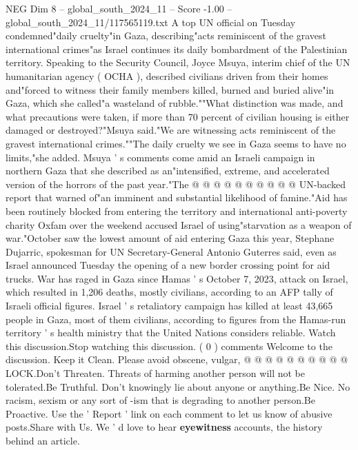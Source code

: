 \begin{textsample}{NEG Dim 8 – global\_south\_2024\_11 – Score -1.00 – global\_south\_2024\_11/117565119.txt}  \label{ex:f8_neg_311}
A top UN official on Tuesday condemned"daily cruelty"in Gaza, describing"acts reminiscent of the gravest international crimes"as Israel continues its daily bombardment of the Palestinian territory.
Speaking to the Security Council, Joyce Msuya, interim chief of the UN humanitarian agency ( OCHA ), described civilians driven from their homes and"forced to witness their family members killed, burned and buried alive"in Gaza, which she called"a wasteland of rubble.""What distinction was made, and what precautions were taken, if more than 70 percent of civilian housing is either damaged or destroyed?"Msuya said."We are witnessing acts reminiscent of the gravest international crimes.""The daily cruelty we see in Gaza seems to have no limits,"she added.
Msuya ' s comments come amid an Israeli campaign in northern Gaza that she described as an"intensified, extreme, and accelerated version of the horrors of the past year."The @ @ @ @ @ @ @ @ @ @ UN-backed report that warned of"an imminent and substantial likelihood of famine."Aid has been routinely blocked from entering the territory and international anti-poverty charity Oxfam over the weekend accused Israel of using"starvation as a weapon of war."October saw the lowest amount of aid entering Gaza this year, Stephane Dujarric, spokesman for UN Secretary-General Antonio Guterres said, even as Israel announced Tuesday the opening of a new border crossing point for aid trucks.
War has raged in Gaza since Hamas ' s October 7, 2023, attack on Israel, which resulted in 1,206 deaths, mostly civilians, according to an AFP tally of Israeli official figures.
Israel ' s retaliatory campaign has killed at least 43,665 people in Gaza, most of them civilians, according to figures from the Hamas-run territory ' s health ministry that the United Nations considers reliable.
Watch this discussion.Stop watching this discussion. ( 0 ) comments Welcome to the discussion.
Keep it Clean.
Please avoid obscene, vulgar, @ @ @ @ @ @ @ @ @ @ LOCK.Don't Threaten.
Threats of harming another person will not be tolerated.Be Truthful.
Don't knowingly lie about anyone or anything.Be Nice.
No racism, sexism or any sort of -ism that is degrading to another person.Be Proactive.
Use the ' Report ' link on each comment to let us know of abusive posts.Share with Us.
We ' d love to hear \textbf{eyewitness} accounts, the history behind an article.

\end{textsample}
